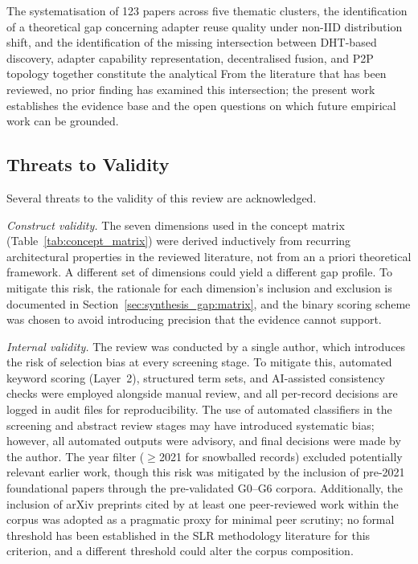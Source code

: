 The systematisation of 123 papers across five thematic clusters, the identification of a theoretical gap concerning adapter reuse quality under non-IID distribution shift, and the identification of the missing
intersection between DHT-based discovery, adapter capability representation,
decentralised fusion, and P2P topology together constitute the analytical
From the literature that has been reviewed, no prior finding has examined this intersection; the present work establishes the evidence base and the open
questions on which future empirical work can be grounded.

\subsection{Threats to Validity}
\label{sec:conclusion:threats}

Several threats to the validity of this review are acknowledged.

\textit{Construct validity.}
The seven dimensions used in the concept matrix (Table~\ref{tab:concept_matrix}) were derived inductively from recurring architectural properties in the reviewed literature, not from an a priori theoretical framework. A different set of dimensions could yield a different gap profile. To mitigate this risk, the rationale for each dimension's inclusion and exclusion is documented in Section~\ref{sec:synthesis_gap:matrix}, and the binary scoring scheme was chosen to avoid introducing precision that the evidence cannot support.

\textit{Internal validity.}
The review was conducted by a single author, which introduces the risk of selection bias at every screening stage. To mitigate this, automated keyword scoring (Layer~2), structured term sets, and AI-assisted consistency checks were employed alongside manual review, and all per-record decisions are logged in audit files for reproducibility. The use of automated classifiers in the screening and abstract review stages may have introduced systematic bias; however, all automated outputs were advisory, and final decisions were made by the author. The year filter ($\geq$2021 for snowballed records) excluded potentially relevant earlier work, though this risk was mitigated by the inclusion of pre-2021 foundational papers through the pre-validated G0--G6 corpora. Additionally, the inclusion of arXiv preprints cited by at least one peer-reviewed work within the corpus was adopted as a pragmatic proxy for minimal peer scrutiny; no formal threshold has been established in the SLR methodology literature for this criterion, and a different threshold could alter the corpus composition.


